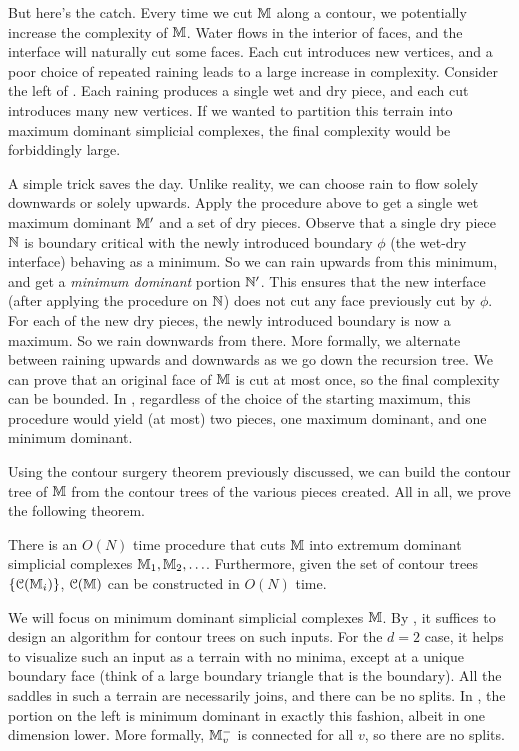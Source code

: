 {But here's the catch. Every time we cut $\mathbb{M}$ along a contour, we potentially increase
the complexity of $\mathbb{M}$. Water flows in the interior of faces, and the interface will naturally
cut some faces. Each cut introduces new vertices, and a poor choice of repeated raining leads
to a large increase in complexity. Consider the left of . Each raining produces a single
wet and dry piece, and each cut introduces many new vertices. If we wanted to partition this terrain into 
maximum dominant simplicial complexes, the final complexity would be forbiddingly large.

A simple trick saves the day. Unlike reality, we can choose rain to flow solely downwards or solely upwards.
Apply the procedure above to get a single wet maximum dominant $\mathbb{M}'$ and a set of dry pieces.
Observe that a single dry piece $\mathbb{N}$ is boundary critical with the newly introduced boundary $\phi$ (the wet-dry interface) behaving as a minimum.
So we can rain upwards from this minimum, and get a \emph{minimum dominant} portion $\mathbb{N}'$.
This ensures that the new interface (after applying the procedure on $\mathbb{N}$) does not
cut any face previously cut by $\phi$.
For each of the new dry pieces, the newly introduced boundary is now a maximum. So we rain downwards from there.
More formally, we alternate between raining upwards and downwards as we go down the recursion tree.
We can prove that an original face of $\mathbb{M}$ is cut at most once, so the final complexity can be bounded.
In , regardless of the choice of the starting maximum,  this procedure would yield (at most) two pieces, 
one maximum dominant, and one minimum dominant.

Using the contour surgery theorem previously discussed, we can build the contour tree of $\mathbb{M}$
from the contour trees of the various pieces created. All in all, we prove the following theorem.

\begin{theorem} \label{thm:int-rain} There is an $O(N)$ time procedure that cuts $\mathbb{M}$ into extremum dominant simplicial complexes
$\mathbb{M}_1, \mathbb{M}_2, \ldots$. Furthermore, given the set of contour trees $\{{\cal C}(\mathbb{M}_i)\}$, ${\cal C}(\mathbb{M})$ can be constructed in $O(N)$ time.
\end{theorem}

 We will focus on minimum dominant simplicial complexes $\mathbb{M}$. By , it suffices
to design an algorithm for contour trees on such inputs. 
For the $d=2$ case, it helps to visualize such an input as a terrain with no minima,
except at a unique boundary face (think of a large boundary triangle that is the boundary).
All the saddles in such a terrain are necessarily joins, and there can be no splits.
In , the portion on the left is minimum dominant in exactly this fashion, albeit in one dimension lower.
More formally, $\mathbb{M}^-_v$ is connected for all $v$, so there are no splits.

}
